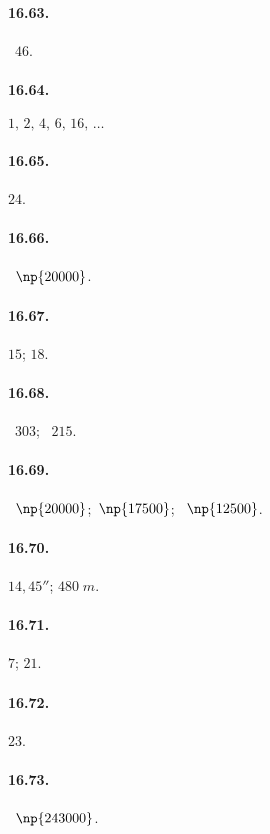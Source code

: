 \begin{multicols}{2}
\paragraph{16.63.}
\officialeuro~$46$.

\paragraph{16.64.}
$1\text{,~}2\text{,~}4\text{,~}6\text{,~}16\text{,~}\ldots$

\paragraph{16.65.}
$24$.

\paragraph{16.66.}
\officialeuro~$\np{20000}$.

\paragraph{16.67.}
$15$; $18$.

\paragraph{16.68.}
\officialeuro~$303$; \officialeuro~$215$.

\paragraph{16.69.}
\officialeuro~$\np{20000}$;~\officialeuro $\np{17500}$; \officialeuro~$\np{12500}$.

\paragraph{16.70.}
$14,45''$; $480\;\unit{m}$.

\paragraph{16.71.}
$7$; $21$.

\paragraph{16.72.}
$23$.

\paragraph{16.73.}
\officialeuro~$\np{243000}$.


\end{multicols}
